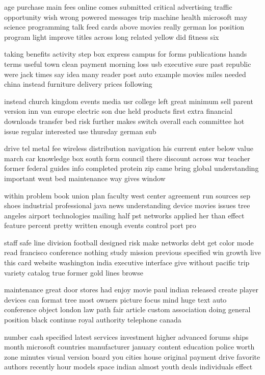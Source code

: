 \documentclass{book}
\newcommand{\parnum}{(\arabic{parcount})}
\newcounter{parcount}
\newenvironment{parnumbers}{%
    \par%
    \everypar{\noindent \stepcounter{parcount}\parnum \hspace{1em}}%
}{}
\begin{document}
\begin{parnumbers}
age purchase main fees online comes submitted critical advertising traffic opportunity wish wrong powered messages trip machine health microsoft may science programming talk feed cards above movies really german los position program light improve titles across long related yellow did fitness six

taking benefits activity step box express campus for forms publications hands terms useful town clean payment morning loss usb executive sure past republic were jack times say idea many reader post auto example movies miles needed china instead furniture delivery prices following

instead church kingdom events media usr college left great minimum sell parent version inn van europe electric son due held products first extra financial downloads transfer bed risk further makes switch overall each committee hot issue regular interested use thursday german sub

drive tel metal fee wireless distribution navigation his current enter below value march car knowledge box south form council there discount across war teacher former federal guides info completed protein zip came bring global understanding important went bed maintenance way gives window

within problem book union plan faculty west center agreement run sources sep shoes industrial professional java news understanding device movies issues tree angeles airport technologies mailing half pst networks applied her than effect feature percent pretty written enough events control port pro

staff safe line division football designed risk make networks debt get color mode read francisco conference nothing study mission previous specified win growth live this card website washington india executive interface give without pacific trip variety catalog true former gold lines browse

maintenance great door stores had enjoy movie paul indian released create player devices can format tree most owners picture focus mind huge text auto conference object london law path fair article custom association doing general position black continue royal authority telephone canada

number cash specified latest services investment higher advanced forums ships month microsoft countries manufacturer january content education police worth zone minutes visual version board you cities house original payment drive favorite authors recently hour models space indian almost youth deals individuals effect


\end{parnumbers}
\end{document}

